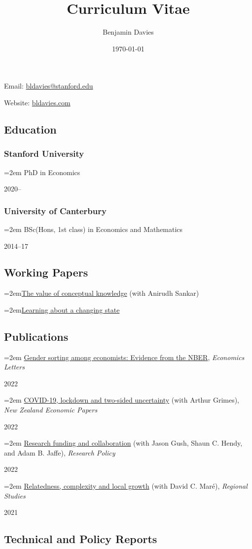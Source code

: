 \documentclass[11pt,oneside]{memoir}
\title{Curriculum Vitae}
\author{Benjamin Davies}
\date{\today}
\newcommand{\entry}[1]{\par\hangindent=2em#1}
\newcommand{\datedentry}[2]{\par\parbox[t]{0.9\linewidth}{\strut\raggedright\hangindent=2em #2\strut}\hfill#1}
\begin{document}
\chapter{\theauthor}

Email: \href{mailto:bldavies@stanford.edu}{bldavies@stanford.edu}

Website: \href{https://bldavies.com}{bldavies.com}

\section{Education}

\subsection{Stanford University}
\datedentry{2020--}{PhD in Economics}

\subsection{University of Canterbury}
\datedentry{2014--17}{BSc(Hons, 1st class) in Economics and Mathematics}

\section{Working Papers}

\entry{\href{https://arxiv.org/abs/2509.09170}{The value of conceptual knowledge} (with Anirudh Sankar)}
\entry{\href{https://arxiv.org/abs/2401.03607}{Learning about a changing state}}


\section{Publications}

\datedentry{2022}{\href{https://doi.org/10.1016/j.econlet.2022.110640}{Gender sorting among economists: Evidence from the NBER}, \emph{Economics Letters}}
\datedentry{2022}{\href{https://doi.org/10.1080/00779954.2020.1806340}{COVID-19, lockdown and two-sided uncertainty} (with Arthur Grimes), \emph{New Zealand Economic Papers}}
\datedentry{2022}{\href{https://doi.org/10.1016/j.respol.2021.104421}{Research funding and collaboration} (with Jason Gush, Shaun C. Hendy, and Adam B. Jaffe), \emph{Research Policy}}
\datedentry{2021}{\href{https://doi.org/10.1080/00343404.2020.1802418}{Relatedness, complexity and local growth} (with David C. Maré), \emph{Regional Studies}}
\section{Technical and Policy Reports}
\end{document}
